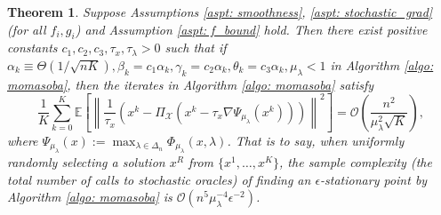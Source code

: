 \documentclass[10pt]{article}
\newtheorem{theorem}{Theorem}
\theoremstyle{remark}
\newcommand{\cO}{\mathcal{O}}
\newcommand{\cX}{\mathcal{X}}
\newcommand{\E}{\mathbb{E}}
\newcommand{\norm}[1]{\left\|#1\right\|}
\begin{document}
\begin{thmbox}
\begin{theorem}\label{thm: momasoba_convergence}
    Suppose Assumptions \ref{aspt: smoothness}, \ref{aspt: stochastic_grad} (for all $f_i, g_i$) and Assumption \ref{aspt: f_bound} hold. Then there exist positive constants $c_1, c_2, c_3, \tau_x, \tau_{\lambda}>0$ such that if $\alpha_k \equiv \Theta(1/\sqrt{nK}), \beta_k = c_1\alpha_k, \gamma_k = c_2\alpha_k, \theta_k = c_3\alpha_k, \mu_{\lambda}<1$ in Algorithm \ref{algo: momasoba}, then the iterates in Algorithm \ref{algo: momasoba} satisfy
    \[
        \frac{1}{K}\sum_{k=0}^{K}\E\left[\norm{\frac{1}{\tau_x}\left(x^k - \Pi_{\cX}\left(x^k - \tau_x\nabla\Psi_{\mu_{\lambda}}(x^k)\right) \right)}^2\right] = \cO\left(\frac{n^2}{\mu_{\lambda}^2\sqrt{K}}\right), 
    \]
    where $\Psi_{\mu_{\lambda}}(x):= \max_{\lambda\in\Delta_n}\Phi_{\mu_{\lambda}}(x, \lambda)$. That is to say, when uniformly randomly selecting a solution $x^R$ from $\{x^1, \dots, x^K\}$, the sample complexity (the total number of calls to stochastic oracles) of finding an $\epsilon$-stationary point by Algorithm \ref{algo: momasoba} is $\cO(n^5\mu_{\lambda}^{-4}\epsilon^{-2})$.
\end{theorem}
\end{thmbox}
\end{document}
